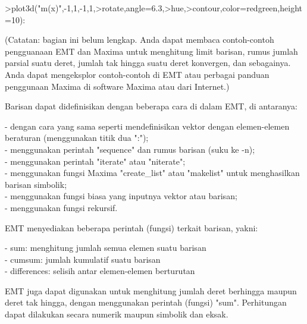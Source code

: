 \documentclass[a4paper,10pt]{article}
\begin{document}
\begin{eulernotebook}
\begin{eulercomment}
\begin{eulercomment}
\begin{eulerprompt}
>plot3d("m(x)",-1,1,-1,1,>rotate,angle=6.3,>hue,>contour,color=redgreen,height=10):
\end{eulerprompt}
\begin{eulercomment}
(Catatan: bagian ini belum lengkap. Anda dapat membaca contoh-contoh pengguanaan EMT dan
Maxima untuk menghitung limit barisan, rumus jumlah parsial suatu deret, jumlah tak hingga
suatu deret konvergen, dan sebagainya. Anda dapat mengeksplor contoh-contoh di EMT atau
perbagai panduan penggunaan Maxima di software Maxima atau dari Internet.)

Barisan dapat didefinisikan dengan beberapa cara di dalam EMT, di antaranya:

- dengan cara yang sama seperti mendefinisikan vektor dengan elemen-elemen beraturan
(menggunakan titik dua ":");\\
- menggunakan perintah "sequence" dan rumus barisan (suku ke -n);\\
- menggunakan perintah "iterate" atau "niterate";\\
- menggunakan fungsi Maxima "create\_list" atau "makelist" untuk menghasilkan barisan
simbolik;\\
- menggunakan fungsi biasa yang inputnya vektor atau barisan;\\
- menggunakan fungsi rekursif.

EMT menyediakan beberapa perintah (fungsi) terkait barisan, yakni:

- sum: menghitung jumlah semua elemen suatu barisan\\
- cumsum: jumlah kumulatif suatu barisan\\
- differences: selisih antar elemen-elemen berturutan

EMT juga dapat digunakan untuk menghitung jumlah deret berhingga maupun deret tak hingga,
dengan menggunakan perintah (fungsi) "sum". Perhitungan dapat dilakukan secara numerik
maupun simbolik dan eksak.


\end{eulercomment}
\end{eulercomment}
\end{eulercomment}
\end{eulernotebook}
\end{document}
